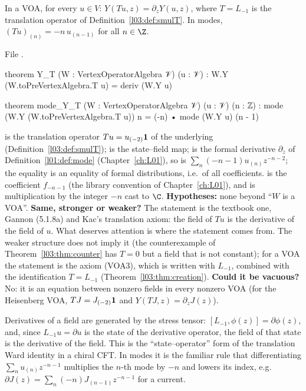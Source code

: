 \begin{theorem}[The derivative property $Y(Tu,z) = \partial_zY(u,z)$]\label{l03:thm:TL}
In a VOA, for every $u\in V$: $Y(Tu,z) = \partial_zY(u,z)$, where $T = L_{-1}$ is the translation operator of
Definition~\ref{l03:def:smulT}. In modes, $(Tu)_{(n)} = -n\,u_{(n-1)}$ for all $n\in\Z$.
\end{theorem}
\noindent File .
\begin{leancode}
theorem Y_T (W : VertexOperatorAlgebra 𝒱) (u : 𝒱) :
    W.Y (W.toPreVertexAlgebra.T u) = deriv (W.Y u)

theorem mode_Y_T (W : VertexOperatorAlgebra 𝒱) (u : 𝒱) (n : ℤ) :
    mode (W.Y (W.toPreVertexAlgebra.T u)) n = (-n) • mode (W.Y u) (n - 1)
\end{leancode}

\begin{dictionary}
 is the translation operator $Tu = u_{(-2)}\mathbf{1}$ of the underlying 
(Definition~\ref{l03:def:smulT});  is the state--field map;  is the formal derivative
$\partial_z$ of Definition~\ref{l01:def:mode} (Chapter~\ref{ch:L01}), so  is
$\sum_n(-n-1)u_{(n)}z^{-n-2}$; the equality is an equality of formal distributions, i.e.\ of all coefficients.
 is the coefficient $f_{-n-1}$ (the library convention of Chapter~\ref{ch:L01}), and
 is multiplication by the integer $-n$ cast to $\C$. \textbf{Hypotheses:} none beyond ``$W$ is a
VOA''. \textbf{Same, stronger or weaker?} The statement is the textbook one, Gannon (5.1.8a) and Kac's translation
axiom: the field of $Tu$ is the derivative of the field of $u$. What deserves attention is where the statement comes
from. The weaker structure  does not imply it (the counterexample of
Theorem~\ref{l03:thm:counter} has $T=0$ but a field that is not constant); for a VOA the statement is the axiom (VOA3),
which is written with $L_{-1}$, combined with the identification $T = L_{-1}$ (Theorem~\ref{l03:thm:creation}). \textbf{Could it be vacuous?} No: it is an
equation between nonzero fields in every nonzero VOA (for the Heisenberg VOA, $T J = J_{(-2)}\mathbf{1}$ and
$Y(TJ,z) = \partial_zJ(z)$).
\end{dictionary}

\begin{physics}
Derivatives of a field are generated by the stress tensor: $[L_{-1},\phi(z)] = \partial\phi(z)$, and, since
$L_{-1}u = \partial u$ is the state of the derivative operator, the field of that state is the derivative of
the field. This is the ``state--operator'' form of the translation Ward identity in a chiral CFT. In modes it is
the familiar rule that differentiating $\sum_nu_{(n)}z^{-n-1}$ multiplies the $n$-th mode by $-n$ and lowers its
index, e.g.\ $\partial J(z)=\sum_n(-n)J_{(n-1)}z^{-n-1}$ for a current.
\end{physics}

